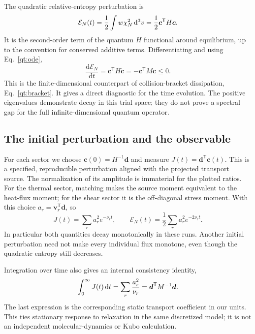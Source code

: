 The quadratic relative-entropy perturbation is
\begin{equation}
 \mathcal E_N(t)=\frac12\int w\chi_N^2\,\mathrm d^3v
 =\frac12\boldsymbol c^{\mathsf T}H\boldsymbol c.
\end{equation}
It is the second-order term of the quantum $H$ functional around equilibrium,
up to the convention for conserved additive terms. Differentiating and using
Eq.~\eqref{qt:ode},
\begin{equation}
 \frac{\mathrm d\mathcal E_N}{\mathrm dt}
 =\boldsymbol c^{\mathsf T}H\dot{\boldsymbol c}
 =-\boldsymbol c^{\mathsf T}M\boldsymbol c\leq0.
 \label{qt:entropydecay}
\end{equation}
This is the finite-dimensional counterpart of collision-bracket dissipation,
Eq.~\eqref{qt:bracket}. It gives a direct diagnostic for the time evolution.
The positive eigenvalues demonstrate decay in this trial space; they do not
prove a spectral gap for the full infinite-dimensional quantum operator.

\subsection{The initial perturbation and the observable}
For each sector we choose $\boldsymbol c(0)=H^{-1}\boldsymbol d$ and measure
$J(t)=\boldsymbol d^{\mathsf T}\boldsymbol c(t)$. This is a specified,
reproducible perturbation aligned with the projected transport source.
The normalization of its amplitude is immaterial for the plotted ratios.
For the thermal sector, matching makes the source moment equivalent to the
heat-flux moment; for the shear sector it is the off-diagonal stress moment.
With this choice $a_r=\boldsymbol v_r^{\mathsf T}\boldsymbol d$, so
\begin{equation}
 J(t)=\sum_r a_r^2e^{-\nu_rt},\qquad
 \mathcal E_N(t)=\frac12\sum_r a_r^2e^{-2\nu_rt}.
\end{equation}
In particular both quantities decay monotonically in these runs. Another
initial perturbation need not make every individual flux monotone, even
though the quadratic entropy still decreases.

Integration over time also gives an internal consistency identity,
\begin{equation}
 \int_0^\infty J(t)\,\mathrm d t
 =\sum_r\frac{a_r^2}{\nu_r}
 =\boldsymbol d^{\mathsf T}M^{-1}\boldsymbol d.
 \label{qt:timeintegral}
\end{equation}
The last expression is the corresponding static transport coefficient in
our units. This ties stationary response to relaxation in the same discretized
model; it is not an independent molecular-dynamics or Kubo calculation.

